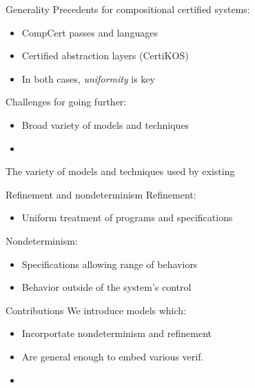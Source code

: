 \documentclass[aspectratio=54]{beamer}
\begin{document}
\begin{frame}{Generality}
  Precedents for compositional certified systems:
  \begin{itemize}
    \item CompCert passes and languages
    \item Certified abstraction layers (CertiKOS)
    \item In both cases, \emph{uniformity} is key
  \end{itemize}

  Challenges for going further:
  \begin{itemize}
    \item Broad variety of models and techniques
    \item 
  \end{itemize}
  The variety of models and techniques used
  by existing 
\end{frame}

\begin{frame}{Refinement and nondeterminism}
  Refinement:
  \begin{itemize}
    \item Uniform treatment of programs and specifications
  \end{itemize}

  Nondeterminism:
  \begin{itemize}
    \item Specifications allowing range of behaviors
    \item Behavior outside of the system's control
  \end{itemize}
\end{frame}


\begin{frame}{Contributions}
  We introduce models which:
  \begin{itemize}
    \item Incorportate nondeterminism and refinement
    \item Are general enough to embed various verif.
    \item 
  \end{itemize}
\end{frame}

\end{document}
